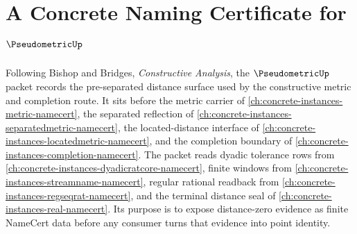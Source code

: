 \chapter{A Concrete Naming Certificate for $\PseudometricUp$}
\label{ch:concrete-instances-pseudometric-namecert}

Following Bishop and Bridges, \emph{Constructive Analysis}, the $\PseudometricUp$ packet records the pre-separated distance surface used by the constructive metric and completion route. It sits before the metric carrier of \autoref{ch:concrete-instances-metric-namecert}, the separated reflection of \autoref{ch:concrete-instances-separatedmetric-namecert}, the located-distance interface of \autoref{ch:concrete-instances-locatedmetric-namecert}, and the completion boundary of \autoref{ch:concrete-instances-completion-namecert}. The packet reads dyadic tolerance rows from \autoref{ch:concrete-instances-dyadicratcore-namecert}, finite windows from \autoref{ch:concrete-instances-streamname-namecert}, regular rational readback from \autoref{ch:concrete-instances-regseqrat-namecert}, and the terminal distance seal of \autoref{ch:concrete-instances-real-namecert}. Its purpose is to expose distance-zero evidence as finite NameCert data before any consumer turns that evidence into point identity.

